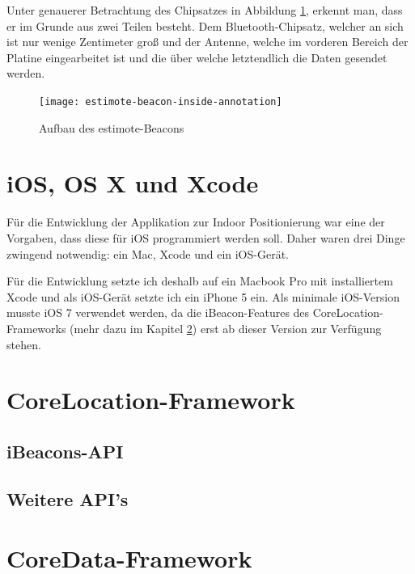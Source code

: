 Unter genauerer Betrachtung des Chipsatzes in Abbildung \ref{estimote-beacon-inside-annotations}, erkennt man, dass er im Grunde aus zwei Teilen besteht.
Dem Bluetooth-Chipsatz, welcher an sich ist nur wenige Zentimeter groß und der Antenne, welche im vorderen Bereich der Platine eingearbeitet ist und die über welche letztendlich die Daten gesendet werden.

\begin{figure}[h!]
	\centering
	\texttt{[image: estimote-beacon-inside-annotation]}
	\caption{Aufbau des estimote-Beacons}
	\label{estimote-beacon-inside-annotations}
\end{figure}



\section{iOS, OS X und Xcode}
\label{sec:technologies:iosandxcode}
Für die Entwicklung der Applikation zur Indoor Positionierung war eine der Vorgaben, dass diese für iOS programmiert werden soll.
Daher waren drei Dinge zwingend notwendig: ein Mac, Xcode und ein iOS-Gerät.

Für die Entwicklung setzte ich deshalb auf ein Macbook Pro mit installiertem Xcode und als iOS-Gerät setzte ich ein iPhone 5 ein.
Als minimale iOS-Version musste iOS 7 verwendet werden, da die iBeacon-Features des CoreLocation-Frameworks (mehr dazu im Kapitel \ref{sec:technologies:corelocation}) erst ab dieser Version zur Verfügung stehen.


\section{CoreLocation-Framework}
\label{sec:technologies:corelocation}


\subsection{iBeacons-API}
\label{sec:technologies:iosandxcode:ibeaconsapi}

\subsection{Weitere API's}
\label{sec:technologies:iosandxcode:otherapis}


\section{CoreData-Framework}
\label{sec:technologies:coredata}
